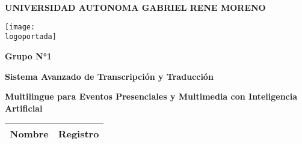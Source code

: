 \documentclass[a4paper]{article} %
\newcommand{\logoportada}{img/Escudo_FICCT.png}
\begin{document}

    \begin{titlepage}
        \centering
        \Large\textbf{UNIVERSIDAD AUTONOMA 
        GABRIEL RENE MORENO}\par\vspace{1.5cm}

        \centering
        \texttt{[image: \\logoportada]}\par\vspace{0.3cm}
        
        {\huge\bfseries\textcolor{titulocolor}{Grupo N°1}}\par\vspace{0.1cm}
        
        \begin{tcolorbox}[colback=red!5!white,colframe=red!75!black]
            \centering
            \Large \textbf{Sistema Avanzado de Transcripción y Traducción}\par
            \Large \textbf{Multilingue para Eventos Presenciales y Multimedia con Inteligencia Artificial }\par
            
        \end{tcolorbox}\par\vspace{1cm}

 
        \hfill  %
        \begin{minipage}{0.79\textwidth} %
            \begin{flushleft}
                
                \begin{longtable}[c]{|l|c|}
                    \hline
                    \rowcolor{bleudefrance} \color{aliceblue}\textbf{Nombre} & \color{aliceblue}\textbf{Registro} \\
                    \hline
                    \endfirsthead
                    

\end{longtable}
\end{flushleft}
\end{minipage}
\end{titlepage}
\end{document}
